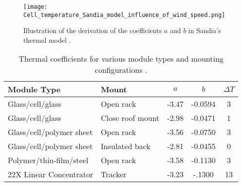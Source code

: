 \begin{figure}
    \centering
    \texttt{[image: Cell\_temperature\_Sandia\_model\_influence\_of\_wind\_speed.png]}
    \caption{\small Illustration of the derivation of the coefficients \(a\) and \(b\)
        in Sandia's thermal model \cite{Kratochvil2004}.}
    \label{fig:Cell_temperature_Sandia_model_influence_of_wind_speed}
\end{figure}

\begin{table}
    \centering
    \begin{tabular}{l l S S S}
        \toprule
        Module Type & Mount & {$a$} & {$b$} & \(\Delta T\) \\
        \midrule
        Glass/cell/glass         & Open rack         & -3.47 & -0.0594 & 3  \\
        Glass/cell/glass         & Close roof mount  & -2.98 & -0.0471 & 1  \\
        Glass/cell/polymer sheet & Open rack         & -3.56 & -0.0750 & 3  \\
        Glass/cell/polymer sheet & Insulated back    & -2.81 & -0.0455 & 0  \\
        Polymer/thin-film/steel  & Open rack         & -3.58 & -0.1130 & 3  \\
        22X Linear Concentrator  & Tracker           & -3.23 & -.1300  & 13 \\
        \bottomrule
    \end{tabular}
    \caption{\small Thermal coefficients for various module types and mounting configurations 
        \cite{Kratochvil2004}.}
    \label{tab:Cell_temperature_thermal_coefficients}
\end{table}
